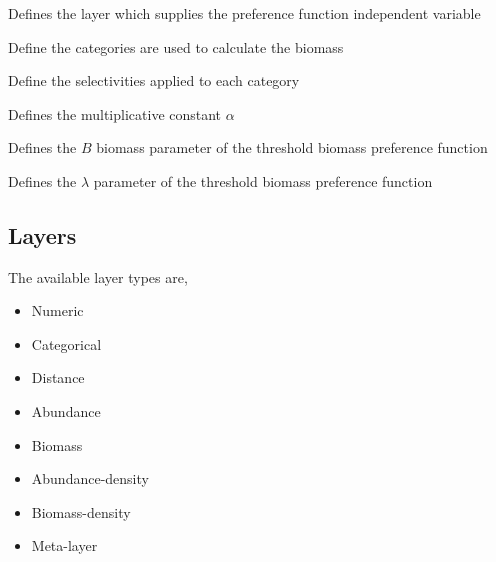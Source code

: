 \subsubsection[Threshold-biomass]{}

 {Defines the layer which supplies the preference function independent variable}

 {Define the categories are used to calculate the biomass}

 {Define the selectivities applied to each category}


 {Defines the multiplicative constant $\alpha$}

 {Defines the $B$ biomass parameter of the threshold biomass preference function}

 {Defines the $\lambda$ parameter of the threshold biomass preference function}

\subsection{Layers}

The available layer types  are, 

\begin{itemize}
	\item Numeric
	\item Categorical
	\item Distance
	\item Abundance
	\item Biomass
	\item Abundance-density
	\item Biomass-density
	\item Meta-layer
\end{itemize}


